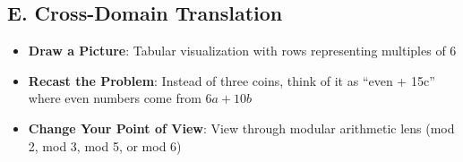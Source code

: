 \documentclass[12pt]{article}
\begin{document}
\begin{strategicbox}
\subsection*{E. Cross-Domain Translation}
\begin{itemize}[leftmargin=*]
    \item \textbf{Draw a Picture}: Tabular visualization with rows representing multiples of 6
    \item \textbf{Recast the Problem}: Instead of three coins, think of it as ``even + 15c'' where even numbers come from $6a + 10b$
    \item \textbf{Change Your Point of View}: View through modular arithmetic lens (mod 2, mod 3, mod 5, or mod 6)
\end{itemize}
\end{strategicbox}
\end{document}
